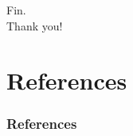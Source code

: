 \documentclass{beamer}
\begin{document}

\begin{frame}
    \center
    \huge{Fin.}\\
    \normalsize{Thank you!}
\end{frame}


\section{References}

\begin{frame}[allowframebreaks]
    \frametitle{References}

    
    
\end{frame}
\end{document}
